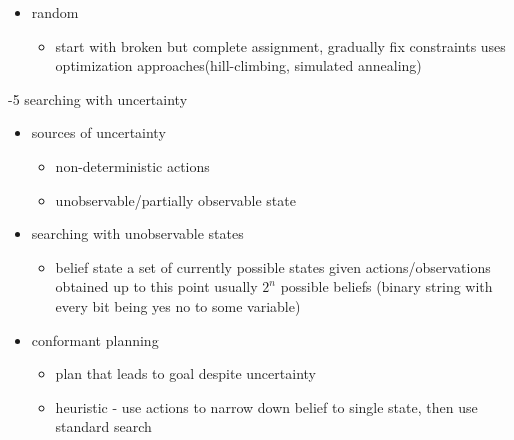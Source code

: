 \documentclass[11pt]{article}
\newcommand{\ee}[1]{\ensuremath{#1}}
\begin{document}
\begin{description}
\begin{itemize}
\begin{itemize}
	
		\item random
		\begin{itemize}
			\item start with broken but complete assignment, gradually fix constraints
			\subitem uses optimization approaches(hill-climbing, simulated annealing)
		\end{itemize}
	
	\end{itemize}

\end{itemize}

\item -5 searching with uncertainty
\begin{itemize}
	\item sources of uncertainty
	\begin{itemize}
		\item non-deterministic actions
		\item unobservable/partially observable state
	\end{itemize}

	\item searching with unobservable states
	\begin{itemize}
		\item belief state
		\subitem a set of currently possible states given actions/observations obtained up to this point
		\subitem usually \ee{2^n} possible beliefs (binary string with every bit being yes no to some variable)
	\end{itemize}

	\item conformant planning
	\begin{itemize}
		\item plan that leads to goal despite uncertainty
		\item heuristic - use actions to narrow down belief to single state, then use standard search
	\end{itemize}


\end{itemize}
\end{description}
\end{document}
